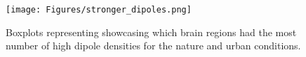 \begin{figure}[H]
	\centering
	\texttt{[image: Figures/stronger\_dipoles.png]}
	\caption{Boxplots representing showcasing which brain regions had the most number of high dipole densities for the nature and urban conditions. \label{fig:stronger_dipoles}}
\end{figure}

